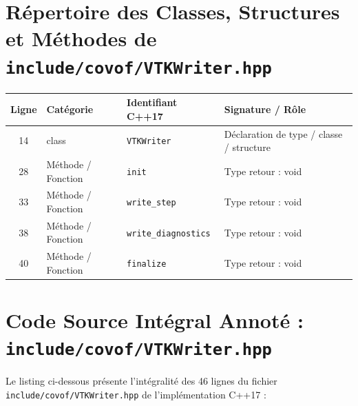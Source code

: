 \documentclass[10pt,a4paper,oneside]{book}
\begin{document}
\section{Répertoire des Classes, Structures et Méthodes de \texttt{include/covof/VTKWriter.hpp}}
\begin{center}\small
\begin{tabular}{clll}
\toprule
\textbf{Ligne} & \textbf{Catégorie} & \textbf{Identifiant C++17} & \textbf{Signature / Rôle} \\
\midrule
14 & class & \texttt{VTKWriter} & Déclaration de type / classe / structure \\
28 & Méthode / Fonction & \texttt{init} & Type retour : void \\
33 & Méthode / Fonction & \texttt{write\_step} & Type retour : void \\
38 & Méthode / Fonction & \texttt{write\_diagnostics} & Type retour : void \\
40 & Méthode / Fonction & \texttt{finalize} & Type retour : void \\
\bottomrule
\end{tabular}
\end{center}

\section{Code Source Intégral Annoté : \texttt{include/covof/VTKWriter.hpp}}
Le listing ci-dessous présente l'intégralité des 46 lignes du fichier \texttt{include/covof/VTKWriter.hpp} de l'implémentation C++17 :
\end{document}
